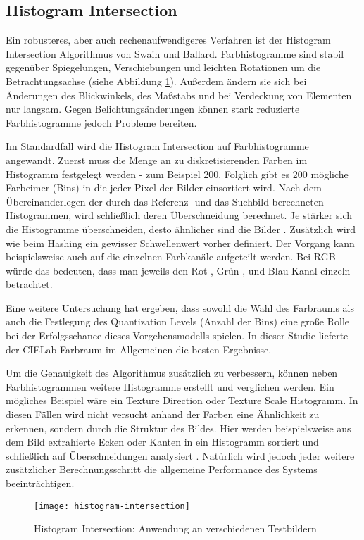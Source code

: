 \subsection{Histogram Intersection}
Ein robusteres, aber auch rechenaufwendigeres Verfahren ist der Histogram
Intersection Algorithmus von Swain und Ballard. Farbhistogramme sind stabil
gegenüber Spiegelungen, Verschiebungen und leichten Rotationen um die
Betrachtungsachse (siehe Abbildung \ref{fig:hintersection}). Außerdem ändern sie
sich bei Änderungen des Blickwinkels, des Maßstabs und bei Verdeckung von
Elementen nur langsam. Gegen Belichtungsänderungen können stark reduzierte
Farbhistogramme jedoch Probleme bereiten. \parencite{histogram-swain-ballard}

Im Standardfall wird die Histogram Intersection auf Farbhistogramme angewandt. 
Zuerst muss die Menge an zu diskretisierenden Farben im Histogramm festgelegt
werden - zum Beispiel 200. Folglich gibt es 200 mögliche \glqq{}Farbeimer\grqq{}
(Bins) in die jeder Pixel der Bilder einsortiert wird. Nach dem
Übereinanderlegen der durch das Referenz- und das Suchbild berechneten
Histogrammen, wird schließlich deren Überschneidung berechnet. Je stärker sich
die Histogramme überschneiden, desto ähnlicher sind die Bilder
\parencite{histogram-image-similarity}. Zusätzlich wird wie beim Hashing ein
gewisser Schwellenwert vorher definiert. Der Vorgang kann beispielsweise auch
auf die einzelnen Farbkanäle aufgeteilt werden. Bei RGB würde das bedeuten, dass
man jeweils den Rot-, Grün-, und Blau-Kanal einzeln betrachtet.
\parencite{histogram-swain-ballard}

Eine weitere Untersuchung hat ergeben, dass sowohl die Wahl des Farbraums als
auch die Festlegung des Quantization Levels (Anzahl der Bins) eine große Rolle
bei der Erfolgsschance dieses Vorgehensmodells spielen. In dieser Studie
lieferte der CIELab-Farbraum im Allgemeinen die besten Ergebnisse.
\parencite{histogram-image-similarity}

Um die Genauigkeit des Algorithmus zusätzlich zu verbessern, können neben
Farbhistogrammen weitere Histogramme erstellt und verglichen werden. Ein
mögliches Beispiel wäre ein \glqq{}Texture Direction\grqq{} oder
\glqq{}Texture Scale\grqq{} Histogramm. In diesen Fällen wird nicht versucht
anhand der Farben eine Ähnlichkeit zu erkennen, sondern durch die Struktur des
Bildes. Hier werden beispielsweise aus dem Bild extrahierte Ecken oder Kanten in
ein Histogramm sortiert und schließlich auf Überschneidungen analysiert
\parencite{histogram-stackoverflow}. Natürlich wird jedoch jeder weitere
zusätzlicher Berechnungsschritt die allgemeine Performance des Systems
beeinträchtigen.

\begin{figure}[H]
    \centering
    \texttt{[image: histogram-intersection]}
    \caption{Histogram Intersection: Anwendung an verschiedenen Testbildern}
    \label{fig:hintersection}
\end{figure}